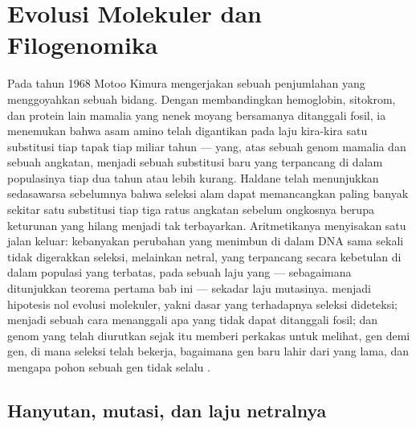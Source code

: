 \chapter{Evolusi Molekuler dan Filogenomika}\label{ch:b3:molecular-evolution}

Pada tahun 1968 Motoo Kimura mengerjakan sebuah penjumlahan yang menggoyahkan sebuah bidang. Dengan
membandingkan hemoglobin, sitokrom, dan protein lain mamalia yang nenek
moyang bersamanya ditanggali fosil, ia menemukan bahwa asam amino telah
digantikan pada laju kira-kira satu substitusi tiap tapak tiap miliar
tahun --- yang, atas sebuah genom mamalia dan sebuah angkatan, menjadi sebuah
substitusi baru yang terpancang di dalam populasinya tiap dua tahun atau lebih kurang. Haldane
telah menunjukkan sedasawarsa sebelumnya bahwa seleksi alam dapat memancangkan paling banyak sekitar
satu substitusi tiap tiga ratus angkatan sebelum ongkosnya berupa
keturunan yang hilang menjadi tak terbayarkan. Aritmetikanya menyisakan satu jalan keluar:
kebanyakan perubahan yang menimbun di dalam DNA sama sekali tidak digerakkan seleksi,
melainkan netral, yang terpancang secara kebetulan di dalam populasi yang terbatas, pada
sebuah laju yang --- sebagaimana ditunjukkan teorema pertama bab ini --- sekadar laju
mutasinya.  menjadi hipotesis nol
evolusi molekuler, yakni dasar yang terhadapnya seleksi dideteksi;
 menjadi sebuah cara menanggali apa yang tidak dapat ditanggali fosil;
dan genom yang telah diurutkan sejak itu memberi perkakas untuk melihat, gen demi
gen, di mana seleksi telah bekerja, bagaimana gen baru lahir dari yang lama, dan
mengapa pohon sebuah gen tidak selalu .

\section{Hanyutan, mutasi, dan laju netralnya}

